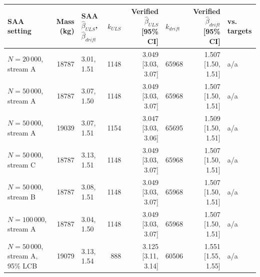 \begin{tabular}{lrlrrlrl}
\toprule
SAA setting & Mass (kg) & SAA $\hat\beta_{ULS}$, $\hat\beta_{drift}$ & $k_{ULS}$ & Verified $\hat\beta_{ULS}$ [95\% CI] & $k_{drift}$ & Verified $\hat\beta_{drift}$ [95\% CI] & vs. targets \\
\midrule
$N=20\,000$, stream A & 18787 & 3.01, 1.51 & 1148 & 3.049 [3.03, 3.07] & 65968 & 1.507 [1.50, 1.51] & a/a \\
$N=50\,000$, stream A & 18787 & 3.07, 1.50 & 1148 & 3.049 [3.03, 3.07] & 65968 & 1.507 [1.50, 1.51] & a/a \\
$N=50\,000$, stream A & 19039 & 3.07, 1.51 & 1154 & 3.047 [3.03, 3.06] & 65695 & 1.509 [1.50, 1.51] & a/a \\
$N=50\,000$, stream C & 18787 & 3.13, 1.51 & 1148 & 3.049 [3.03, 3.07] & 65968 & 1.507 [1.50, 1.51] & a/a \\
$N=50\,000$, stream B & 18787 & 3.08, 1.51 & 1148 & 3.049 [3.03, 3.07] & 65968 & 1.507 [1.50, 1.51] & a/a \\
$N=100\,000$, stream A & 18787 & 3.04, 1.50 & 1148 & 3.049 [3.03, 3.07] & 65968 & 1.507 [1.50, 1.51] & a/a \\
$N=50\,000$, stream A, 95\% LCB & 19079 & 3.13, 1.54 & 888 & 3.125 [3.11, 3.14] & 60506 & 1.551 [1.55, 1.55] & a/a \\
\bottomrule
\end{tabular}